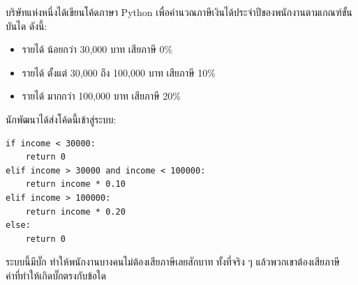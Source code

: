 \question บริษัทแห่งหนึ่งได้เขียนโค้ดภาษา Python เพื่อคำนวณภาษีเงินได้ประจำปีของพนักงานตามเกณฑ์ขั้นบันได ดังนี้:
\begin{itemize}
    \item รายได้ น้อยกว่า 30,000 บาท เสียภาษี 0\%
    \item รายได้ ตั้งแต่ 30,000 ถึง 100,000 บาท เสียภาษี 10\%
    \item รายได้ มากกว่า 100,000 บาท เสียภาษี 20\%
\end{itemize}
นักพัฒนาได้ส่งโค้ดนี้เข้าสู่ระบบ:
\begin{verbatim}
if income < 30000:
    return 0
elif income > 30000 and income < 100000:
    return income * 0.10
elif income > 100000:
    return income * 0.20
else:
    return 0
\end{verbatim}
ระบบนี้มีบั๊ก ทำให้พนักงานบางคนไม่ต้องเสียภาษีเลยสักบาท ทั้งที่จริง ๆ แล้วพวกเขาต้องเสียภาษี ค่าที่ทำให้เกิดบั๊กตรงกับข้อใด\newline
{}
